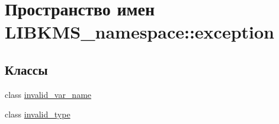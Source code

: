 \hypertarget{namespaceLIBKMS__namespace_1_1exception}{\section{Пространство имен L\-I\-B\-K\-M\-S\-\_\-namespace\-:\-:exception}
\label{namespaceLIBKMS__namespace_1_1exception}
}
\subsection*{Классы}
\begin{DoxyCompactItemize}
\item 
class \hyperlink{classLIBKMS__namespace_1_1exception_1_1invalid__var__name}{invalid\-\_\-var\-\_\-name}
\item 
class \hyperlink{classLIBKMS__namespace_1_1exception_1_1invalid__type}{invalid\-\_\-type}
\end{DoxyCompactItemize}
